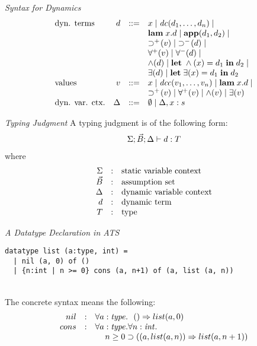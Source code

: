 \documentclass[pdf]{prosper}
\begin{document}
\def\dc{{\it dc}}
\def\dcc{{\it dcc}}
\def\dcf{{\it dcf}}
\def\iforall#1{\forall^{+}(#1)}
\def\eforall#1{\forall^{-}(#1)}
\def\iguard#1{\supset^{+}\kern-2pt(#1)}
\def\eguard#1{\supset^{-}\kern-2pt(#1)}
\def\lam#1#2{\mbox{\bf lam}\;#1.#2}
\def\app#1#2{\mbox{\bf app}(#1,#2)}
\def\letin#1#2{\mbox{\bf let}\;#1\;{\bf in}\;#2}
\begin{slide}{\em Syntax for Dynamics}
\[\begin{array}{lrcl}
\mbox{dyn. terms} & d & ::= & x \mid \dc(d_1,\ldots,d_n) \mid \\
& & & \lam{x}{d} \mid \app{d_1}{d_2} \mid \\
& & & \iguard{v} \mid \;\eguard{d} \mid \\
& & & \iforall{v} \mid \eforall{d} \mid \\
& & & \Band(d) \mid \letin{\Band(x)=d_1}{d_2} \mid \\
& & & \exists(d) \mid \letin{\exists(x)=d_1}{d_2} \\
\mbox{values} & v & ::= & x \mid \dcc(v_1,\ldots,v_n) \mid \lam{x}{d} \mid \\
& & & \iguard{v} \mid \iforall{v} \mid \Band(v) \mid \exists(v) \\
\mbox{dyn. var. ctx.} & \Delta & ::= & \emptyset \mid \Delta, x:s \\
\end{array}\]
\end{slide}
\begin{slide}{\em Typing Judgment}
A typing judgment is of the following form:
\[\begin{array}{c}
\Sigma;\vec{B};\Delta\vdash d:T
\end{array}\]
where
\[\begin{array}{rcl}
\Sigma & : & \mbox{static variable context} \\
\vec{B} & : & \mbox{assumption set} \\
\Delta & : & \mbox{dynamic variable context} \\
d & : & \mbox{dynamic term} \\
T & : & \mbox{type} \\
\end{array}\]
\end{slide}
\begin{slide}{\em A Datatype Declaration in ATS}
{\blue\begin{verbatim}
datatype list (a:type, int) =
  | nil (a, 0) of ()
  | {n:int | n >= 0} cons (a, n+1) of (a, list (a, n))
\end{verbatim}
}
~\\
The concrete syntax means the following:
\[\begin{array}{rcl}
nil & : & \forall a:{\it type}.~~() \Rightarrow list (a, 0) \\
cons & : & \forall a:{\it type}.\forall n:{\it int}. \\
     &   & \kern12pt n\geq 0 \supset ((a, list (a, n)) \Rightarrow list (a, n+1)) \\
\end{array}\]
\vfill
\end{slide}
\end{document}
